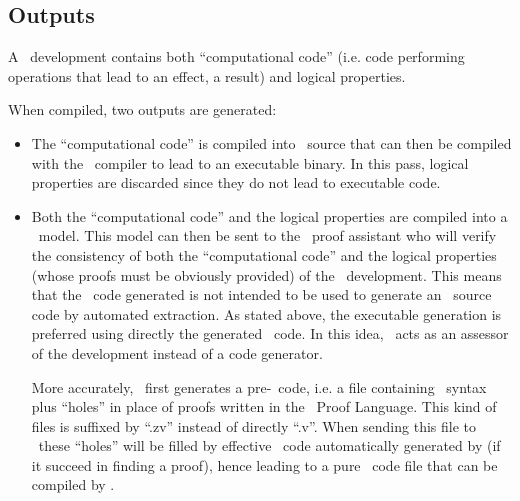 


\subsection{Outputs}
A \focal\ development contains both
``computational code'' (i.e. code performing operations that lead to
an effect, a result) and logical properties.

\smallskip
When compiled, two outputs are generated:
\begin{itemize}
  \item The ``computational code'' is compiled into \ocaml\ source
    that can then be compiled with the \ocaml\ compiler to lead to an
    executable binary. In this pass, logical properties are discarded
    since they do not lead to executable code.
  \item Both the ``computational code'' and the logical properties are
    compiled into a \coq\ model. This model can then be sent to the
    \coq\ proof assistant who will verify the consistency of both the
    ``computational code'' and the logical properties (whose
    proofs must be obviously provided) of the
    \focal\ development. This means that the \coq\ code generated is
    not intended to be used to generate an \ocaml\ source code by
    automated extraction. As stated above, the executable generation
    is preferred using directly the generated \ocaml\ code. In this
    idea, \coq\ acts as an assessor of the development instead of a
    code generator.

    More accurately, \focal\ first generates a pre-\coq\ code, i.e. a
    file containing \coq\ syntax plus ``holes'' in place of proofs
    written in the \focal\ Proof Language. This kind of files is
    suffixed by ``.zv'' instead of directly ``.v''. When sending this
    file to \zenon\ these ``holes'' will be filled by effective
    \coq\ code automatically generated by \zenon (if it succeed in
    finding a proof), hence leading to a pure \coq\ code file that can
    be compiled by \coq.
\end{itemize}



